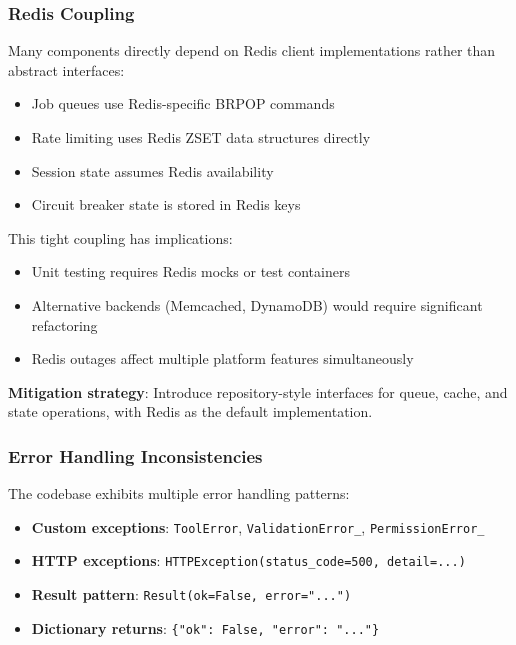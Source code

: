 \subsubsection{Redis Coupling}

Many components directly depend on Redis client implementations rather than abstract interfaces:

\begin{itemize}
    \item Job queues use Redis-specific BRPOP commands
    \item Rate limiting uses Redis ZSET data structures directly
    \item Session state assumes Redis availability
    \item Circuit breaker state is stored in Redis keys
\end{itemize}

This tight coupling has implications:
\begin{itemize}
    \item Unit testing requires Redis mocks or test containers
    \item Alternative backends (Memcached, DynamoDB) would require significant refactoring
    \item Redis outages affect multiple platform features simultaneously
\end{itemize}

\textbf{Mitigation strategy}: Introduce repository-style interfaces for queue, cache, and state operations, with Redis as the default implementation.

\subsubsection{Error Handling Inconsistencies}

The codebase exhibits multiple error handling patterns:

\begin{itemize}
    \item \textbf{Custom exceptions}: \texttt{ToolError}, \texttt{ValidationError\_}, \texttt{PermissionError\_}
    \item \textbf{HTTP exceptions}: \texttt{HTTPException(status\_code=500, detail=...)}
    \item \textbf{Result pattern}: \texttt{Result(ok=False, error="...")}
    \item \textbf{Dictionary returns}: \texttt{\{"ok": False, "error": "..."\}}
\end{itemize}

